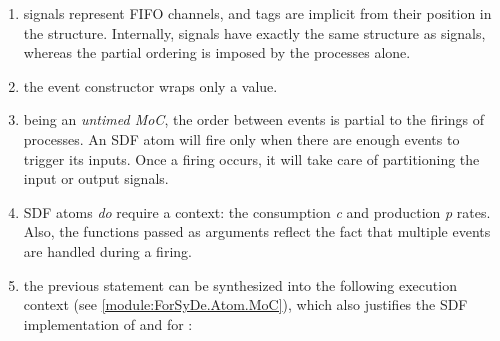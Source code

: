                  \begin{enumerate}
                 \item 
                 signals represent FIFO channels, and tags are implicit from
 their position in the 
 structure. Internally,  signals have
 exactly the same structure as  signals,
 whereas the partial ordering is imposed by the processes alone.\par
                 
                 \item 
                 the  event constructor wraps only a
 value.\par
                 
                 \item 
                 being an \emph{untimed MoC}, the order between events is partial to
 the firings of processes. An SDF atom will fire only when there
 are enough events to trigger its inputs. Once a firing occurs, it
 will take care of partitioning the input or output signals.\par
                 
                 \item 
                 SDF atoms \emph{do} require a context: the consumption \emph{c} and
 production \emph{p} rates. Also, the functions passed as arguments
 reflect the fact that multiple events are handled during a
 firing.\par
                 
                 \item 
                 the previous statement can be synthesized into the following
 execution context (see \cref{module:ForSyDe.Atom.MoC}), which also
 justifies the SDF implementation of  and
 for :\par
                 
                 \end{enumerate}
                 \par
                 
